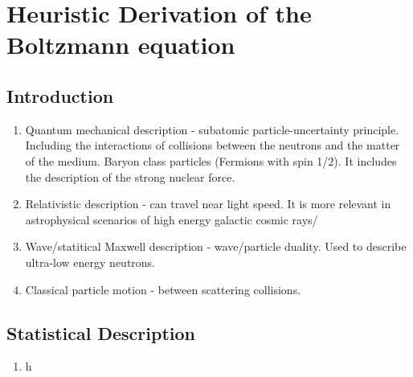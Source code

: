 \documentclass[11pt]{article}
\begin{document}
\section{Heuristic Derivation of the Boltzmann equation}
\subsection{Introduction}
\begin{enumerate}
    \item Quantum mechanical description - subatomic particle-uncertainty principle. Including the interactions of collisions between the neutrons and the matter of the medium. Baryon class particles (Fermions with spin 1/2). It includes the description of the strong nuclear force.
    \item Relativistic description - can travel near light speed. It is more relevant in astrophysical scenarios of high energy galactic cosmic rays/
    \item Wave/statitical Maxwell description - wave/particle duality. Used to describe ultra-low energy neutrons.
    \item Classical particle motion - between scattering collisions.
\end{enumerate}
\subsection{Statistical Description}
\begin{enumerate}
    \item h
\end{enumerate}
\end{document}
